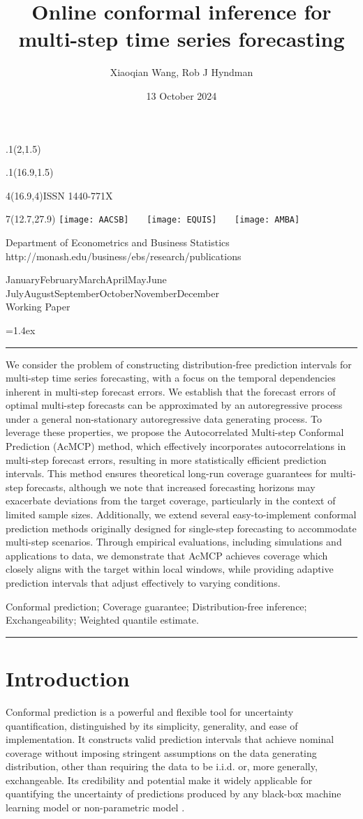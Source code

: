 \documentclass[
  11pt,
  a4paper,
]{article}
\title{Online conformal inference for multi-step time series
forecasting}
\date{13 October 2024}
\author{Xiaoqian Wang, Rob J Hyndman}
\makeatletter
\theoremstyle{plain}
\theoremstyle{remark}
\def\placefig#1#2#3#4{\begin{textblock}{.1}(#1,#2)\rlap{\texttt{[image: \#4]}}\end{textblock}}
\def\Date{\number\day}
\def\Month{\ifcase\month\or
 January\or February\or March\or April\or May\or June\or
 July\or August\or September\or October\or November\or December\fi}
\def\Year{\number\year}
\def\showjel{{\large\textsf{\textbf{JEL classification:}}~\@jel}}
\def\cover{{\sffamily\setcounter{page}{0}
        \thispagestyle{empty}
        \placefig{2}{1.5}{width=5cm}{monash2}
        \placefig{16.9}{1.5}{width=2.1cm}{MBSportrait}
        \begin{textblock}{4}(16.9,4)ISSN 1440-771X\end{textblock}
        \begin{textblock}{7}(12.7,27.9)\hfill
        \texttt{[image: AACSB]}~~~
        \texttt{[image: EQUIS]}~~~
        \texttt{[image: AMBA]}
        \end{textblock}
        \vspace*{2.5cm}
        \begin{center}\Large
        Department of Econometrics and Business Statistics\\[.5cm]
        \footnotesize http://monash.edu/business/ebs/research/publications
        \end{center}\vspace{2cm}
        \begin{center}
        \fbox{\parbox{14cm}{\begin{onehalfspace}\centering\Huge\vspace*{0.3cm}
                \textsf{\textbf{\expandafter{\@title}}}\vspace{1cm}\par
                \LARGE
                \expandafter{\@author}
                \end{onehalfspace}
        }}
        \end{center}
        \vfill
                \begin{center}\Large
                \Month~\Year\\[1cm]
                Working Paper \@wp
        \end{center}\vspace*{2cm}}}
\def\pageone{{\sffamily\setstretch{1}%
        \thispagestyle{empty}%
        \vbox to \textheight{%
        \raggedright\baselineskip=1.2cm
     {\fontsize{24.88}{30}\sffamily\textbf{\expandafter{\@title}}}
        \vspace{2cm}\par
        \hspace{1cm}\parbox{14cm}{\sffamily\large\@addresses}\vspace{1cm}\vfill
        \hspace{1cm}{\large\Date~\Month~\Year}\\[1cm]
        \hspace{1cm}\showjel\vss}}}
\def\blindtitle{{\sffamily
     \thispagestyle{plain}\raggedright\baselineskip=1.2cm
     {\fontsize{24.88}{30}\sffamily\textbf{\expandafter{\@title}}}\vspace{1cm}\par
        }}
\def\titlepage{{\cover\newpage\pageone\newpage\blindtitle}}
\let\maketitle\titlepage
\newenvironment{keywords}{\par\vspace{0.5cm}\noindent{\sffamily\textbf{Keywords:}}}{\vspace{0.25cm}\par\hrule\vspace{0.5cm}\par}
\renewenvironment{abstract}{\begin{minipage}{\textwidth}\parskip=1.4ex\noindent
\hrule\vspace{0.1cm}\par{\sffamily\textbf{\abstractname}}\newline\setstretch{1.1}}
  {\end{minipage}}
\makeatother
\begin{document}
\maketitle

\begin{abstract}
We consider the problem of constructing distribution-free prediction
intervals for multi-step time series forecasting, with a focus on the
temporal dependencies inherent in multi-step forecast errors. We
establish that the forecast errors of optimal multi-step forecasts can
be approximated by an autoregressive process under a general
non-stationary autoregressive data generating process. To leverage these
properties, we propose the Autocorrelated Multi-step Conformal
Prediction (AcMCP) method, which effectively incorporates
autocorrelations in multi-step forecast errors, resulting in more
statistically efficient prediction intervals. This method ensures
theoretical long-run coverage guarantees for multi-step forecasts,
although we note that increased forecasting horizons may exacerbate
deviations from the target coverage, particularly in the context of
limited sample sizes. Additionally, we extend several easy-to-implement
conformal prediction methods originally designed for single-step
forecasting to accommodate multi-step scenarios. Through empirical
evaluations, including simulations and applications to data, we
demonstrate that AcMCP achieves coverage which closely aligns with the
target within local windows, while providing adaptive prediction
intervals that adjust effectively to varying conditions.
\end{abstract}

\begin{keywords}
  Conformal prediction; Coverage guarantee; Distribution-free
inference; Exchangeability; 
  Weighted quantile estimate.
\end{keywords}


\section{Introduction}\label{sec-intro}

Conformal prediction \autocite{vovk2005} is a powerful and flexible tool
for uncertainty quantification, distinguished by its simplicity,
generality, and ease of implementation. It constructs valid prediction
intervals that achieve nominal coverage without imposing stringent
assumptions on the data generating distribution, other than requiring
the data to be i.i.d. or, more generally, exchangeable. Its credibility
and potential make it widely applicable for quantifying the uncertainty
of predictions produced by any black-box machine learning model
\autocite{shafer2008,papadopoulos2008,barber2021} or non-parametric
model \autocite{lei2014}.
\end{document}
